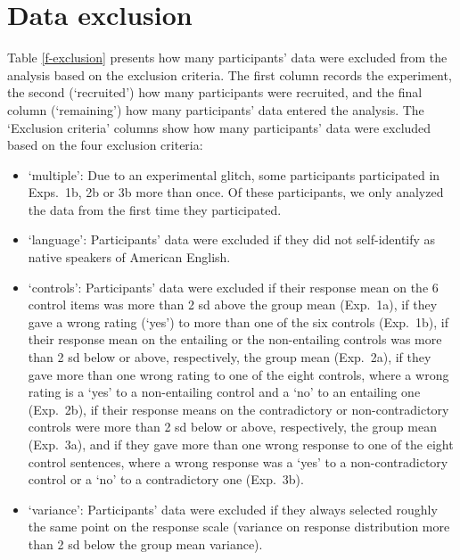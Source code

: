 \documentclass[11pt,fleqn]{article}
\newcommand{\6}{\mbox{$[\hspace*{-.6mm}[$}}
\newcommand{\9}{\mbox{$]\hspace*{-.6mm}]$}}
\begin{document}
\section{Data exclusion}\label{a-excl}

Table \ref{f-exclusion} presents how many participants' data were excluded from the analysis based on the exclusion criteria. The first column records the experiment, the second (`recruited') how many participants were recruited, and the final column (`remaining') how many participants' data entered the analysis. The `Exclusion criteria' columns show how many participants' data were excluded based on the four exclusion criteria: 

\begin{itemize}[topsep = -1ex,itemsep=-2pt]

\item `multiple': Due to an experimental glitch, some participants participated in Exps.~1b, 2b or 3b more than once. Of these participants, we only analyzed the data from the first time they participated.

\item `language': Participants' data were excluded if they did not self-identify as native speakers of American English.

\item `controls': Participants' data were excluded if their response mean on the 6 control items was more than 2 sd above the group mean (Exp.~1a), if they gave a wrong rating (`yes') to more than one of the six controls (Exp.~1b), if their response mean on the entailing or the non-entailing controls was more than 2 sd below or above, respectively, the group mean (Exp.~2a), if they gave more than one wrong rating to one of the eight controls, where a wrong rating is a `yes' to a non-entailing control and a `no' to an entailing one (Exp.~2b), if their response means on the contradictory or non-contradictory controls were more than 2 sd below or above, respectively, the group mean (Exp.~3a), and if they gave more than one wrong response to one of the eight control sentences, where a wrong response was a `yes' to a non-contradictory control or a `no' to a contradictory one (Exp.~3b).

\item `variance': Participants' data were excluded if they always selected roughly the same point on the response scale (variance on response distribution more than 2 sd below the group mean variance).

\end{itemize}
\end{document}
